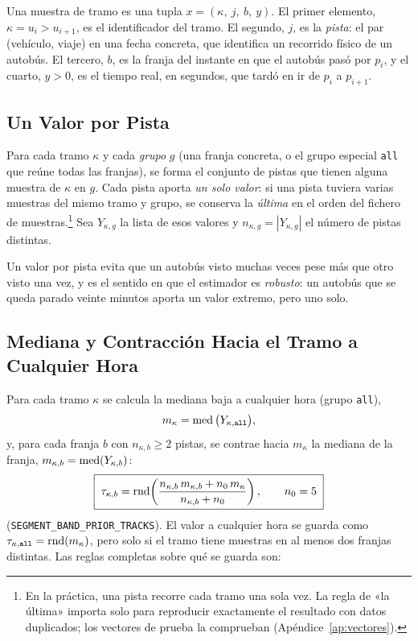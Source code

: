 \begin{definicion}
Una muestra de tramo es una tupla $x=(\kappa,\ j,\ b,\ y)$. El primer elemento, $\kappa=u_i{>}u_{i+1}$, es el
identificador del tramo. El segundo, $j$, es la \emph{pista}: el par (vehículo, viaje) en una fecha concreta, que
identifica un recorrido físico de un autobús. El tercero, $b$, es la franja del instante en que el autobús pasó por
$p_i$, y el cuarto, $y>0$, es el tiempo real, en segundos, que tardó en ir de $p_i$ a $p_{i+1}$.
\end{definicion}

\subsection{Un Valor por Pista}

Para cada tramo $\kappa$ y cada \emph{grupo} $g$ (una franja concreta, o el grupo especial \texttt{all} que reúne
todas las franjas), se forma el conjunto de pistas que tienen alguna muestra de $\kappa$ en $g$. Cada pista aporta
\emph{un solo valor}: si una pista tuviera varias muestras del mismo tramo y grupo, se conserva la \emph{última} en el
orden del fichero de muestras.\footnote{En la práctica, una pista recorre cada tramo una sola vez. La regla de «la
última» importa solo para reproducir exactamente el resultado con datos duplicados; los vectores de prueba la
comprueban (Apéndice~\ref{ap:vectores}).} Sea $Y_{\kappa,g}$ la lista de esos valores y $n_{\kappa,g}=|Y_{\kappa,g}|$
el número de pistas distintas.

Un valor por pista evita que un autobús visto muchas veces pese más que otro visto una vez, y es el sentido en que el
estimador es \emph{robusto}: un autobús que se queda parado veinte minutos aporta un valor extremo, pero uno solo.

\subsection{Mediana y Contracción Hacia el Tramo a Cualquier Hora}
\label{sec:contraccion-tramo}

Para cada tramo $\kappa$ se calcula la mediana baja a cualquier hora (grupo \texttt{all}),
\begin{equation}
m_{\kappa}=\operatorname{med}\big(Y_{\kappa,\texttt{all}}\big),
\end{equation}
y, para cada franja $b$ con $n_{\kappa,b}\ge2$ pistas, se contrae hacia $m_\kappa$ la mediana de la franja,
$m_{\kappa,b}=\operatorname{med}(Y_{\kappa,b})$:
\begin{equation}
\label{eq:contraccion-tramo}
\boxed{\;\tau_{\kappa,b}=\operatorname{rnd}\!\left(\frac{n_{\kappa,b}\,m_{\kappa,b}+n_0\,m_\kappa}{n_{\kappa,b}+n_0}\right),
\qquad n_0=5\;}
\end{equation}
(\texttt{SEGMENT\_BAND\_PRIOR\_TRACKS}). El valor a cualquier hora se guarda como
$\tau_{\kappa,\texttt{all}}=\operatorname{rnd}(m_\kappa)$, pero solo si el tramo tiene muestras en al menos dos franjas
distintas. Las reglas completas sobre qué se guarda son:

